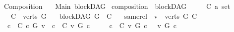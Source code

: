 %
\begin{isabellebody}%
%
%
\isadelimtheory
\isanewline
\isanewline
%
\endisadelimtheory
%
\isatagtheory
{}\isamarkupfalse%
\ Composition\isanewline
\ \ \ Main\ blockDAG\isanewline
{}%
\endisatagtheory
{\isafoldtheory}%
%
\isadelimtheory
%
\endisadelimtheory
%
\isadelimdocument
%
\endisadelimdocument
%
\isatagdocument
%
\isamarkuptrue%
%
\endisatagdocument
{\isafolddocument}%
%
\isadelimdocument
%
\endisadelimdocument
{}\isamarkupfalse%
\ composition\ {\isacharequal}{\kern0pt}\ blockDAG\ \ {\isacharplus}{\kern0pt}\isanewline
\ \ \ C\ {\isacharcolon}{\kern0pt}{\isacharcolon}{\kern0pt}{\isachardoublequoteopen}{\isacharprime}{\kern0pt}a\ set{\isachardoublequoteclose}\isanewline
\ \ \ {\isachardoublequoteopen}C\ {\isasymsubseteq}\ verts\ G{\isachardoublequoteclose}\isanewline
\ \ \ {\isachardoublequoteopen}blockDAG\ {\isacharparenleft}{\kern0pt}G\ {\isasymrestriction}\ C{\isacharparenright}{\kern0pt}{\isachardoublequoteclose}\isanewline
\ \ \ same{\isacharunderscore}{\kern0pt}rel{\isacharcolon}{\kern0pt}\ \ {\isachardoublequoteopen}{\isasymforall}v\ {\isasymin}\ {\isacharparenleft}{\kern0pt}{\isacharparenleft}{\kern0pt}verts\ G{\isacharparenright}{\kern0pt}{\isacharminus}{\kern0pt}\ C{\isacharparenright}{\kern0pt}{\isachardot}{\kern0pt}\ \isanewline
\ \ {\isacharparenleft}{\kern0pt}{\isasymforall}c\ {\isasymin}\ C{\isachardot}{\kern0pt}\ {\isacharparenleft}{\kern0pt}c\ {\isasymrightarrow}\isactrlsup {\isacharplus}{\kern0pt}\isactrlbsub G\isactrlesub \ v{\isacharparenright}{\kern0pt}{\isacharparenright}{\kern0pt}\ {\isasymor}\ {\isacharparenleft}{\kern0pt}{\isasymforall}c\ {\isasymin}\ C{\isachardot}{\kern0pt}\ {\isacharparenleft}{\kern0pt}v\ {\isasymrightarrow}\isactrlsup {\isacharplus}{\kern0pt}\isactrlbsub G\isactrlesub \ c{\isacharparenright}{\kern0pt}{\isacharparenright}{\kern0pt}\ \isanewline
\ \ \ {\isasymor}\ {\isacharparenleft}{\kern0pt}{\isasymforall}c\ {\isasymin}\ C{\isachardot}{\kern0pt}\ {\isasymnot}{\isacharparenleft}{\kern0pt}v\ {\isasymrightarrow}\isactrlsup {\isacharplus}{\kern0pt}\isactrlbsub G\isactrlesub \ c{\isacharparenright}{\kern0pt}\ {\isasymand}\ \ {\isasymnot}{\isacharparenleft}{\kern0pt}v\ {\isasymrightarrow}\isactrlsup {\isacharplus}{\kern0pt}\isactrlbsub G\isactrlesub \ c{\isacharparenright}{\kern0pt}{\isacharparenright}{\kern0pt}\ {\isachardoublequoteclose}\ \ \ \ \ \ \ \isanewline
\isanewline

\end{isabellebody}
